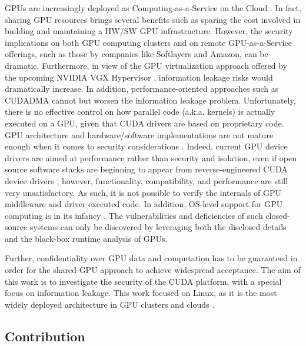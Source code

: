 \documentclass[11pt,onecolumn,letterpaper]{IEEEtran}
\begin{document}
GPUs are increasingly deployed as Computing-as-a-Service on the Cloud \cite{actualgpuinthecloud,vgpuvirtualization}.
In fact, sharing GPU resources brings several benefits such as sparing the cost involved in building  and maintaining a HW/SW GPU infrastructure.
However, the security implications on both GPU computing clusters and on remote GPU-as-a-Service offerings, 
such as those by companies like Softlayers and Amazon, can be dramatic.
Furthermore, in view of the GPU virtualization approach offered by the upcoming NVIDIA VGX Hypervisor \cite{vgxhypervisor},
information leakage risks would dramatically increase. 
In addition, performance-oriented approaches such as CUDADMA \cite{cudadma} cannot but worsen the information leakage problem.
Unfortunately, there is no effective control on how parallel code (a.k.a. kernels) is actually executed on a GPU,
given that CUDA drivers are based on proprietary code.
GPU architecture and hardware/software implementations are not mature enough when it comes to security considerations \cite{nvidiavuln1,nvidiavuln2}.
Indeed, current GPU device drivers are aimed at performance rather than security and isolation, even if 
open source software stacks are beginning to appear from reverse-engineered CUDA device drivers \cite{gdev};
however, functionality, compatibility, and performance are still very unsatisfactory.
As such, it is not possible to verify the internals of GPU middleware and driver executed code.
In addition, OS-level support for GPU computing is in its infancy \cite{kgpu}. 
The vulnerabilities and deficiencies of such closed-source systems can only be discovered
by leveraging both the disclosed details and the black-box runtime analysis of GPUs.

Further, confidentiality over GPU data and computation has to be guaranteed in order for the shared-GPU approach to achieve widespread acceptance.
The aim of this work is to investigate the security of the CUDA 
platform, with a special focus on information leakage. 
This work focused on Linux, as it is the most widely deployed architecture in GPU clusters and clouds \cite{linuxinthecloud}.

\subsection{Contribution}
\end{document}
